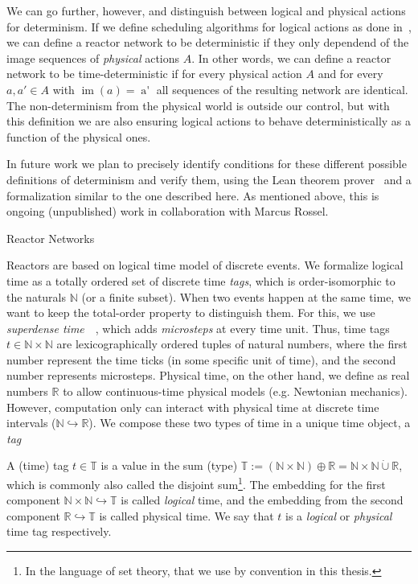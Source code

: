 \begin{defn}
\begin{defn}
We can go further, however, and distinguish between logical and physical actions for determinism. 
If we define scheduling algorithms for logical actions as done in~\cite{lohstroh_cyphy19,lohstroh_phdthesis}, we can define a reactor network to be deterministic if they only dependend of the image sequences of \emph{physical} actions $A$.
In other words, we can define a reactor network to be time-deterministic if for every physical action $A$ and for every $a, a' \in A$ with $\operatorname{im}(a) = \operatorname{a'}$ all sequences of the resulting network are identical.
The non-determinism from the physical world is outside our control, but with this definition we are also ensuring logical actions to behave deterministically as a function of the physical ones. 

In future work we plan to precisely identify conditions for these different possible definitions of determinism and verify them, using the Lean theorem prover~\cite{lean} and a formalization similar to the one described here.
As mentioned above, this is ongoing (unpublished) work in collaboration with Marcus Rossel.

Reactor Networks


Reactors are based on logical time model of discrete events.
We formalize logical time as a totally ordered set of discrete time \emph{tags}, which is order-isomorphic to the naturals $\mathbb{N}$ (or a finite subset). 
When two events happen at the same time, we want to keep the total-order property to distinguish them.
For this, we use \emph{superdense time}~\cite{superdense,Ptolemaeus:14:SystemDesign}~, which adds \emph{microsteps} at every time unit.
Thus, time tags $t \in \mathbb{N} \times \mathbb{N}$ are lexicographically ordered tuples of natural numbers, where the first number represent the time ticks (in some specific unit of time), and the second number represents microsteps.
Physical time, on the other hand, we define as real numbers $\mathbb{R}$ to allow continuous-time physical models (e.g. Newtonian mechanics).
However, computation only can interact with physical time at discrete time intervals ($\mathbb{N} \hookrightarrow \mathbb{R}$).
We compose these two types of time in a unique time object, a \emph{tag}

\begin{defn}[tag]
    \label{defn:tags}
   A (time) tag $t \in \mathbb{T}$ is a value in the sum (type) $\mathbb{T} := (\mathbb{N} \times \mathbb{N}) \oplus \mathbb{R} = \mathbb{N} \times \mathbb{N} \dot{\cup} \mathbb{R}$, which is commonly also called the disjoint sum\footnote{In the language of set theory, that we use by convention in this thesis.}.
   The embedding for the first component $\mathbb{N} \times \mathbb{N} \hookrightarrow \mathbb{T}$ is called \emph{logical} time, and the embedding from the second component $\mathbb{R} \hookrightarrow \mathbb{T}$ is called physical time.
   We say that $t$ is a \emph{logical} or \emph{physical} time tag respectively.
\end{defn}


\end{defn}
\end{defn}
